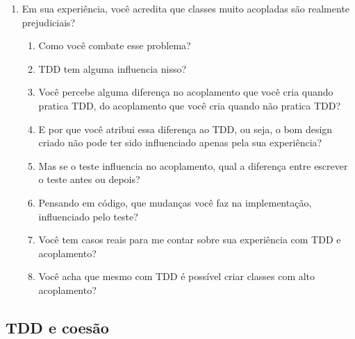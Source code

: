 \begin{enumerate}
	\item{Em sua experiência, você acredita que classes muito acopladas são realmente prejudiciais?}
		\begin{enumerate}
			\item Como você combate esse problema?

			\item TDD tem alguma influencia nisso?
			
			\item Você percebe alguma diferença no acoplamento que você cria quando
			pratica TDD, do acoplamento que você cria quando não pratica TDD?
			
			\item E por que você atribui essa diferença ao TDD, ou seja, o bom design
			criado não pode ter sido influenciado apenas pela sua experiência?
			
			\item Mas se o teste influencia no acoplamento, 
			qual a diferença entre escrever o teste antes ou depois?

			\item Pensando em código, que mudanças você faz na implementação, influenciado
			pelo teste?
			
			\item Você tem casos reais para me contar sobre sua experiência com TDD e 
			acoplamento?
			
			\item Você acha que mesmo com TDD é possível criar classes com alto acoplamento? 
		\end{enumerate}
\end{enumerate}

\subsection{TDD e coesão}
\label{entrevista:coesao}

